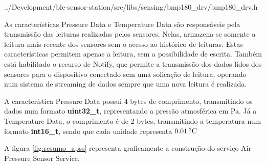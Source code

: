 \begin{minipage}{0.95\linewidth}

{../Development/ble-sensor-station/src/libs/sensing/bmp180_drv/bmp180_drv.h}
\end{minipage}

As características Pressure Data e Temperature Data são responsáveis pela
transmissão das leituras realizadas pelos sensores. Nelas, armazena-se somente a
leitura mais recente dos sensores sem o acesso ao histórico de leituras. Estas
características permitem apenas a leitura, sem a possibilidade de escrita.
Também está habilitado o recurso de Notify, que permite a transmissão dos
dados lidos dos sensores para o dispositivo conectado sem uma solicação de
leitura, operando num sistema de streaming de dados sempre que uma nova leitura
é realizada.

A característica Pressure Data possui 4 bytes de comprimento, transmitindo os
dados num formato \textbf{uint32\_t}, representando a pressão atmosférica em Pa.
Já a Temperature Data, o comprimento é de 2 bytes, transmitindo a temperatura
num formato \textbf{int16\_t}, sendo que cada unidade representa
$0.01\,^{\circ}{\rm C}$ 

A figura \ref{fig:resumo_apss} representa graficamente a construção do serviço
Air Pressure Sensor Service.

